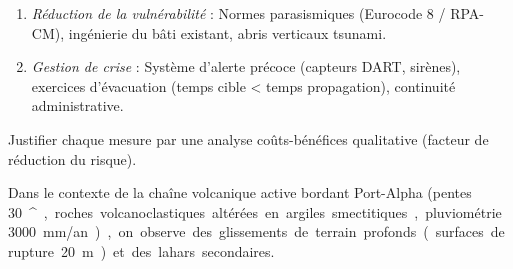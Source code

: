 \documentclass[11pt]{article}
\providecommand{\degree}{^{\circ}}
\begin{document}
\begin{exercice}
\begin{enumerate}
\begin{enumerate}
      \item \textit{Réduction de la vulnérabilité} : Normes parasismiques (Eurocode 8 / RPA-CM), ingénierie du bâti existant, abris verticaux tsunami.
      \item \textit{Gestion de crise} : Système d'alerte précoce (capteurs DART, sirènes), exercices d'évacuation (temps cible < temps propagation), continuité administrative.
      \end{enumerate}
      Justifier chaque mesure par une analyse coûts-bénéfices qualitative (facteur de réduction du risque).
\end{enumerate}
\end{exercice}

\begin{exercice}
Dans le contexte de la chaîne volcanique active bordant Port-Alpha (pentes \SI{30}{\degree}, roches volcanoclastiques altérées en argiles smectitiques, pluviométrie \SI{3000}{mm/an}), on observe des glissements de terrain profonds (surfaces de rupture \SI{20}{m}) et des lahars secondaires.


\end{exercice}
\end{document}

